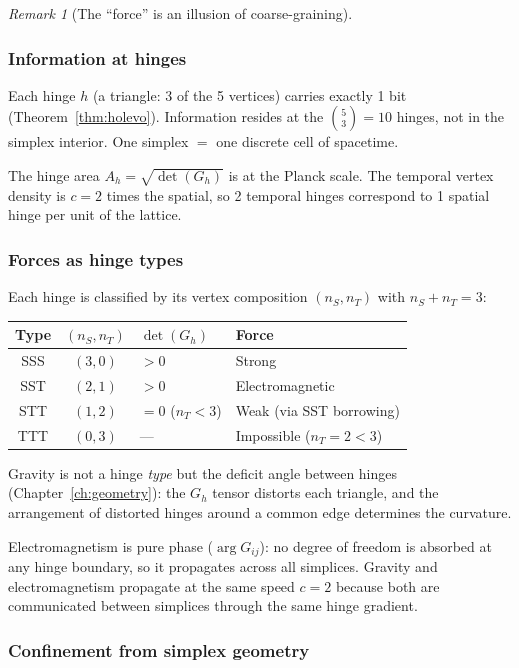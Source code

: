 \documentclass[12pt]{article}
\theoremstyle{remark}
\newtheorem{remark}[theorem]{Remark}
\theoremstyle{definition}
\begin{document}
\begin{remark}[The ``force'' is an illusion of coarse-graining]
\subsubsection{Information at hinges}

Each hinge $h$ (a triangle: 3 of the 5 vertices) carries exactly 1 bit (Theorem~\ref{thm:holevo}). Information resides at the $\binom{5}{3} = 10$ hinges, not in the simplex interior. One simplex $=$ one discrete cell of spacetime.

The hinge area $A_h = \sqrt{\det(G_h)}$ is at the Planck scale. The temporal vertex density is $c = 2$ times the spatial, so 2 temporal hinges correspond to 1 spatial hinge per unit of the lattice.

\subsubsection{Forces as hinge types}

Each hinge is classified by its vertex composition $(n_S, n_T)$ with $n_S + n_T = 3$:

\begin{center}
\begin{tabular}{ccll}
\hline
Type & $(n_S, n_T)$ & $\det(G_h)$ & Force \\
\hline
SSS & $(3,0)$ & $> 0$ & Strong \\
SST & $(2,1)$ & $> 0$ & Electromagnetic \\
STT & $(1,2)$ & $= 0$ ($n_T < 3$) & Weak (via SST borrowing) \\
TTT & $(0,3)$ & --- & Impossible ($n_T = 2 < 3$) \\
\hline
\end{tabular}
\end{center}

Gravity is not a hinge \emph{type} but the deficit angle between hinges (Chapter~\ref{ch:geometry}): the $G_h$ tensor distorts each triangle, and the arrangement of distorted hinges around a common edge determines the curvature.

Electromagnetism is pure phase ($\arg G_{ij}$): no degree of freedom is absorbed at any hinge boundary, so it propagates across all simplices. Gravity and electromagnetism propagate at the same speed $c = 2$ because both are communicated between simplices through the same hinge gradient.

\subsubsection{Confinement from simplex geometry}


\end{remark}
\end{document}
